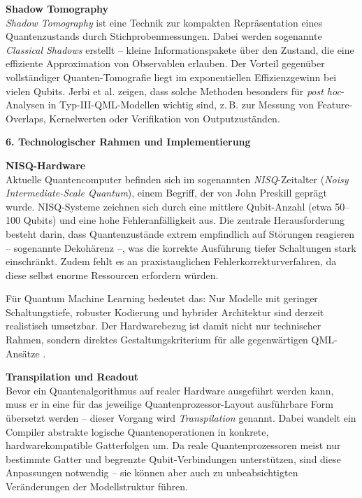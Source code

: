 \vspace{0.1cm}
\noindent
\textbf{Shadow Tomography}\\
\textit{Shadow Tomography} ist eine Technik zur kompakten Repräsentation eines Quantenzustands durch Stichprobenmessungen. Dabei werden sogenannte \textit{Classical Shadows} erstellt – kleine Informationspakete über den Zustand, die eine effiziente Approximation von Observablen erlauben. Der Vorteil gegenüber vollständiger Quanten-Tomografie liegt im exponentiellen Effizienzgewinn bei vielen Qubits. Jerbi et al. zeigen, dass solche Methoden besonders für \textit{post hoc}-Analysen in Typ-III-QML-Modellen wichtig sind, z.\,B. zur Messung von Feature-Overlaps, Kernelwerten oder Verifikation von Outputzuständen.
\cite{jerbi_quantum_2023}

\vspace{1cm}
\noindent\textbf{6. Technologischer Rahmen und Implementierung}  

\vspace{0.3cm}
\noindent
\textbf{NISQ-Hardware}\\
\vspace{0.2cm}
Aktuelle Quantencomputer befinden sich im sogenannten \textit{NISQ}-Zeitalter (\textit{Noisy Intermediate-Scale Quantum}), einem Begriff, der von John Preskill geprägt wurde. NISQ-Systeme zeichnen sich durch eine mittlere Qubit-Anzahl (etwa 50–100 Qubits) und eine hohe Fehleranfälligkeit aus. Die zentrale Herausforderung besteht darin, dass Quantenzustände extrem empfindlich auf Störungen reagieren – sogenannte Dekohärenz –, was die korrekte Ausführung tiefer Schaltungen stark einschränkt. Zudem fehlt es an praxistauglichen Fehlerkorrekturverfahren, da diese selbst enorme Ressourcen erfordern würden.  

Für Quantum Machine Learning bedeutet das: Nur Modelle mit geringer Schaltungstiefe, robuster Kodierung und hybrider Architektur sind derzeit realistisch umsetzbar. Der Hardwarebezug ist damit nicht nur technischer Rahmen, sondern direktes Gestaltungskriterium für alle gegenwärtigen QML-Ansätze \cite{preskill_quantum_2018}.

\vspace{0.5cm}
\noindent
\textbf{Transpilation und Readout}\\
Bevor ein Quantenalgorithmus auf realer Hardware ausgeführt werden kann, muss er in eine für das jeweilige Quantenprozessor-Layout ausführbare Form übersetzt werden – dieser Vorgang wird \textit{Transpilation} genannt. Dabei wandelt ein Compiler abstrakte logische Quantenoperationen in konkrete, hardwarekompatible Gatterfolgen um. Da reale Quantenprozessoren meist nur bestimmte Gatter und begrenzte Qubit-Verbindungen unterstützen, sind diese Anpassungen notwendig – sie können aber auch zu unbeabsichtigten Veränderungen der Modellstruktur führen.

